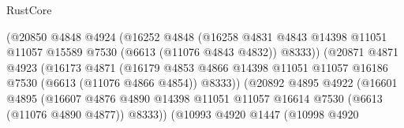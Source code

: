 \begin{lexlean}{RustCore}
\begin{coremodule}
                                      (@20850
                                        @4848
                                        @4924
                                        (@16252
                                          @4848
                                          (@16258
                                            @4831
                                            @4843
                                            @14398
                                            @11051
                                            @11057
                                            @15589
                                            @7530
                                            (@6613 (@11076 @4843 @4832))
                                            @8333))
                                        (@20871
                                          @4871
                                          @4923
                                          (@16173
                                            @4871
                                            (@16179
                                              @4853
                                              @4866
                                              @14398
                                              @11051
                                              @11057
                                              @16186
                                              @7530
                                              (@6613 (@11076 @4866 @4854))
                                              @8333))
                                          (@20892
                                            @4895
                                            @4922
                                            (@16601
                                              @4895
                                              (@16607
                                                @4876
                                                @4890
                                                @14398
                                                @11051
                                                @11057
                                                @16614
                                                @7530
                                                (@6613 (@11076 @4890 @4877))
                                                @8333))
                                            (@10993
                                              @4920
                                              @1447
                                              (@10998
                                                @4920

\end{coremodule}
\end{lexlean}
